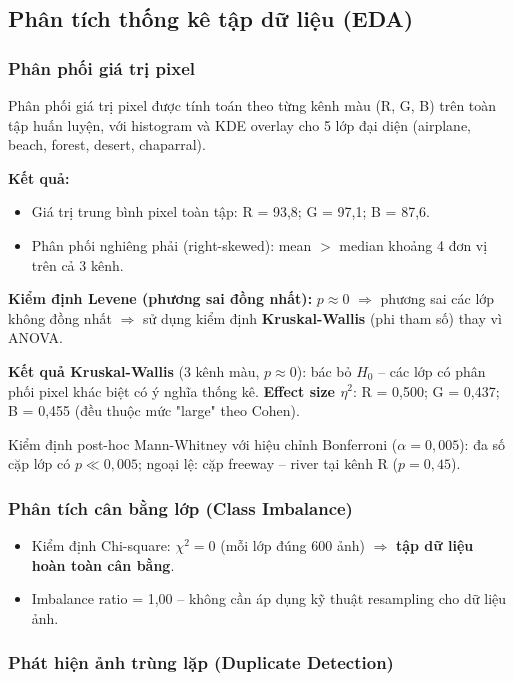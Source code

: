 \documentclass[12pt,a4paper]{article}
\let\oldtextbf\textbf
\renewcommand{\textbf}[1]{\oldtextbf{\textcolor{hcmublue}{#1}}}
\begin{document}
\subsection{Phân tích thống kê tập dữ liệu (EDA)}

\subsubsection{Phân phối giá trị pixel}

Phân phối giá trị pixel được tính toán theo từng kênh màu (R, G, B) trên toàn tập huấn luyện, với histogram và KDE overlay cho 5 lớp đại diện (airplane, beach, forest, desert, chaparral).

\textbf{Kết quả:}
\begin{itemize}
    \item Giá trị trung bình pixel toàn tập: R = 93,8; G = 97,1; B = 87,6.
    \item Phân phối nghiêng phải (right-skewed): mean $>$ median khoảng 4 đơn vị trên cả 3 kênh.
\end{itemize}

\textbf{Kiểm định Levene (phương sai đồng nhất):} $p \approx 0$ $\Rightarrow$ phương sai các lớp không đồng nhất $\Rightarrow$ sử dụng kiểm định \textbf{Kruskal-Wallis} (phi tham số) thay vì ANOVA.

\textbf{Kết quả Kruskal-Wallis} (3 kênh màu, $p \approx 0$): bác bỏ $H_0$ -- các lớp có phân phối pixel khác biệt có ý nghĩa thống kê. \textbf{Effect size $\eta^2$}: R = 0,500; G = 0,437; B = 0,455 (đều thuộc mức "large" theo Cohen).

Kiểm định post-hoc Mann-Whitney với hiệu chỉnh Bonferroni ($\alpha = 0{,}005$): đa số cặp lớp có $p \ll 0{,}005$; ngoại lệ: cặp freeway -- river tại kênh R ($p = 0{,}45$).

\subsubsection{Phân tích cân bằng lớp (Class Imbalance)}

\begin{itemize}
    \item Kiểm định Chi-square: $\chi^2 = 0$ (mỗi lớp đúng 600 ảnh) $\Rightarrow$ \textbf{tập dữ liệu hoàn toàn cân bằng}.
    \item Imbalance ratio = 1,00 -- không cần áp dụng kỹ thuật resampling cho dữ liệu ảnh.
\end{itemize}

\subsubsection{Phát hiện ảnh trùng lặp (Duplicate Detection)}
\end{document}
